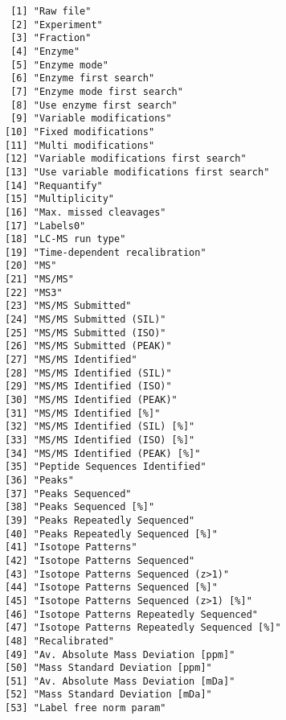 \documentclass[
  letterpaper,
  DIV=11,
  numbers=noendperiod]{scrartcl}
\begin{document}
\begin{verbatim}
 [1] "Raw file"                                 
 [2] "Experiment"                               
 [3] "Fraction"                                 
 [4] "Enzyme"                                   
 [5] "Enzyme mode"                              
 [6] "Enzyme first search"                      
 [7] "Enzyme mode first search"                 
 [8] "Use enzyme first search"                  
 [9] "Variable modifications"                   
[10] "Fixed modifications"                      
[11] "Multi modifications"                      
[12] "Variable modifications first search"      
[13] "Use variable modifications first search"  
[14] "Requantify"                               
[15] "Multiplicity"                             
[16] "Max. missed cleavages"                    
[17] "Labels0"                                  
[18] "LC-MS run type"                           
[19] "Time-dependent recalibration"             
[20] "MS"                                       
[21] "MS/MS"                                    
[22] "MS3"                                      
[23] "MS/MS Submitted"                          
[24] "MS/MS Submitted (SIL)"                    
[25] "MS/MS Submitted (ISO)"                    
[26] "MS/MS Submitted (PEAK)"                   
[27] "MS/MS Identified"                         
[28] "MS/MS Identified (SIL)"                   
[29] "MS/MS Identified (ISO)"                   
[30] "MS/MS Identified (PEAK)"                  
[31] "MS/MS Identified [%]"                     
[32] "MS/MS Identified (SIL) [%]"               
[33] "MS/MS Identified (ISO) [%]"               
[34] "MS/MS Identified (PEAK) [%]"              
[35] "Peptide Sequences Identified"             
[36] "Peaks"                                    
[37] "Peaks Sequenced"                          
[38] "Peaks Sequenced [%]"                      
[39] "Peaks Repeatedly Sequenced"               
[40] "Peaks Repeatedly Sequenced [%]"           
[41] "Isotope Patterns"                         
[42] "Isotope Patterns Sequenced"               
[43] "Isotope Patterns Sequenced (z>1)"         
[44] "Isotope Patterns Sequenced [%]"           
[45] "Isotope Patterns Sequenced (z>1) [%]"     
[46] "Isotope Patterns Repeatedly Sequenced"    
[47] "Isotope Patterns Repeatedly Sequenced [%]"
[48] "Recalibrated"                             
[49] "Av. Absolute Mass Deviation [ppm]"        
[50] "Mass Standard Deviation [ppm]"            
[51] "Av. Absolute Mass Deviation [mDa]"        
[52] "Mass Standard Deviation [mDa]"            
[53] "Label free norm param"                    
\end{verbatim}
\end{document}
